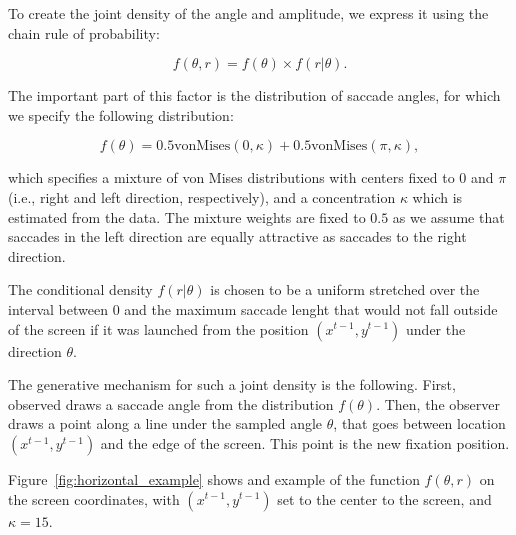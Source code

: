 \documentclass{article}
\begin{document}
To create the joint density of the angle and amplitude, we express it using the chain rule of probability:

\begin{equation}
    f(\theta, r) = f(\theta) \times f(r | \theta).
\end{equation}

The important part of this factor is the distribution of saccade angles, for which we specify the following distribution:

\begin{equation}
    f(\theta) = 0.5 \text{vonMises}(0, \kappa) + 0.5 \text{vonMises}(\pi, \kappa),
\end{equation}

which specifies a mixture of von Mises distributions with centers fixed to 0 and $\pi$ (i.e., right and left direction, respectively), and a concentration $\kappa$ which is estimated from the data. The mixture weights are fixed to $0.5$ as we assume that saccades in the left direction are equally attractive as saccades to the right direction.

The conditional density $f(r | \theta)$ is chosen to be a uniform stretched over the interval between 0 and the maximum saccade lenght that would not fall outside of the screen if it was launched from the position $(x^{t-1}, y^{t-1})$ under the direction $\theta$.

The generative mechanism for such a joint density is the following. First, observed draws a saccade angle from the distribution $f(\theta)$. Then, the observer draws a point along a line under the sampled angle $\theta$, that goes between location $(x^{t-1}, y^{t-1})$ and the edge of the screen. This point is the new fixation position.

Figure~\ref{fig:horizontal_example} shows and example of the function $f(\theta, r)$ on the screen coordinates, with $(x^{t-1}, y^{t-1})$ set to the center to the screen, and $\kappa = 15$.
\end{document}
